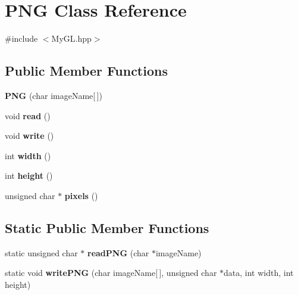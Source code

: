 \hypertarget{classPNG}{}\section{P\+NG Class Reference}
\label{classPNG}


{\ttfamily \#include $<$My\+G\+L.\+hpp$>$}

\subsection*{Public Member Functions}
\begin{DoxyCompactItemize}
\item 
{\bfseries P\+NG} (char image\+Name\mbox{[}$\,$\mbox{]})\hypertarget{classPNG_a8239ef58cce7dfa23bf02a7620e985f5}{}\label{classPNG_a8239ef58cce7dfa23bf02a7620e985f5}

\item 
void {\bfseries read} ()\hypertarget{classPNG_a48b56be2d085e01f01b140528f999f5b}{}\label{classPNG_a48b56be2d085e01f01b140528f999f5b}

\item 
void {\bfseries write} ()\hypertarget{classPNG_a3e0b622c7ab188c3024295f8eebedd04}{}\label{classPNG_a3e0b622c7ab188c3024295f8eebedd04}

\item 
int {\bfseries width} ()\hypertarget{classPNG_a2b1a554b4f86d1b8ffa07c298782b14d}{}\label{classPNG_a2b1a554b4f86d1b8ffa07c298782b14d}

\item 
int {\bfseries height} ()\hypertarget{classPNG_ad6f6685a921c0f26352e22dc144fdda6}{}\label{classPNG_ad6f6685a921c0f26352e22dc144fdda6}

\item 
unsigned char $\ast$ {\bfseries pixels} ()\hypertarget{classPNG_a07898bac65710ae8aaeea6048dc773bc}{}\label{classPNG_a07898bac65710ae8aaeea6048dc773bc}

\end{DoxyCompactItemize}
\subsection*{Static Public Member Functions}
\begin{DoxyCompactItemize}
\item 
static unsigned char $\ast$ {\bfseries read\+P\+NG} (char $\ast$image\+Name)\hypertarget{classPNG_a6df04a0372aa1054cc85a219829d882a}{}\label{classPNG_a6df04a0372aa1054cc85a219829d882a}

\item 
static void {\bfseries write\+P\+NG} (char image\+Name\mbox{[}$\,$\mbox{]}, unsigned char $\ast$data, int width, int height)\hypertarget{classPNG_a12fe7f480b617e0cd58bd0ca7a65ed3a}{}\label{classPNG_a12fe7f480b617e0cd58bd0ca7a65ed3a}

\end{DoxyCompactItemize}
